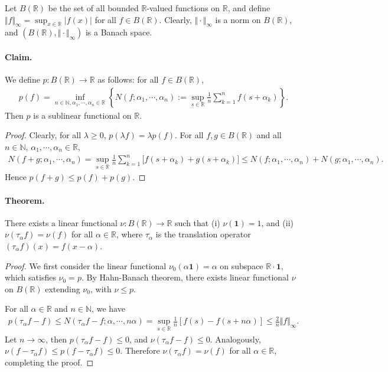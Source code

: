 \documentclass{article}
\begin{document}
Let $B(\mathbb{R})$ be the set of all bounded $\mathbb{R}$-valued functions on $\mathbb{R}$, and define $\Vert f\Vert_\infty = \sup_{x\in\mathbb{R}}\vert f(x)\vert$ for all $f\in B(\mathbb{R})$. Clearly, $\Vert\cdot\Vert_\infty$ is a norm on $B(\mathbb{R})$, and $(B(\mathbb{R}),\Vert\cdot\Vert_\infty)$ is a Banach space.

\paragraph{Claim.} We define $p:B(\mathbb{R})\to\mathbb{R}$ as follows: for all $f\in B(\mathbb{R})$,
\begin{align*}
	p(f) = \inf_{n\in\mathbb{N},\alpha_1,\cdots,\alpha_n\in\mathbb{R}}\left\{N(f;\alpha_1,\cdots,\alpha_n):=\sup_{s\in\mathbb{R}}\frac{1}{n}\sum_{k=1}^n f(s+\alpha_k)\right\}.
\end{align*}
Then $p$ is a sublinear functional on $\mathbb{R}$.
\begin{proof}
Clearly, for all $\lambda\geq 0$, $p(\lambda f)=\lambda p(f)$. For all $f,g\in B(\mathbb{R})$ and all $n\in\mathbb{N}$, $\alpha_1,\cdots,\alpha_n\in\mathbb{R}$,
\begin{align*}
	N(f+g;\alpha_1,\cdots,\alpha_n) = \sup_{s\in\mathbb{R}}\frac{1}{n}\sum_{k=1}^n \bigl[f(s+\alpha_k) + g(s+\alpha_k)\bigr] \leq N(f;\alpha_1,\cdots,\alpha_n) + N(g;\alpha_1,\cdots,\alpha_n).
\end{align*}
Hence $p(f+g)\leq p(f) + p(g)$.
\end{proof}
\paragraph{Theorem.} There exists a linear functional $\nu:B(\mathbb{R})\to\mathbb{R}$ such that (i) $\nu(\mathbf{1})=1$, and (ii) $\nu(\tau_\alpha f)=\nu(f)$ for all $\alpha\in\mathbb{R}$, where $\tau_\alpha$ is the translation operator $(\tau_\alpha f)(x) = f(x-\alpha)$.
\begin{proof}
We first consider the linear functional $\nu_0(\alpha\mathbf{1})=\alpha$ on subspace $\mathbb{R}\cdot\mathbf{1}$, which satisfies $\nu_0=p$. By Hahn-Banach theorem, there exists linear functional $\nu$ on $B(\mathbb{R})$ extending $\nu_0$, with $\nu\leq p$.
\vspace{0.1cm}

For all $\alpha\in\mathbb{R}$ and $n\in\mathbb{N}$, we have
\begin{align*}
	p(\tau_\alpha f-f)\leq N(\tau_\alpha f-f;\alpha,\cdots,n\alpha) = \sup_{s\in\mathbb{R}}\frac{1}{n}\left[f(s) - f(s+n\alpha)\right] \leq \frac{2}{n}\Vert f\Vert_\infty.
\end{align*}
Let $n\to\infty$, then $p(\tau_\alpha f-f)\leq 0$, and $\nu(\tau_\alpha f-f)\leq 0$. Analogously, $\nu(f-\tau_\alpha f) \leq p(f-\tau_\alpha f)\leq 0$. Therefore $\nu(\tau_\alpha f)=\nu(f)$ for all $\alpha\in\mathbb{R}$, completing the proof.
\end{proof}
\end{document}

